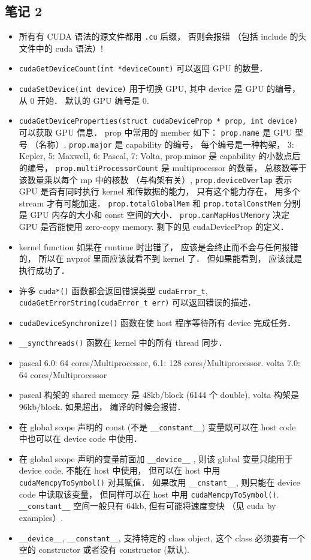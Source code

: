\subsection{笔记 2}
\begin{itemize}
\item 所有有 CUDA 语法的源文件都用 \verb`.cu` 后缀， 否则会报错 （包括 include 的头文件中的 cuda 语法）!
\item \verb`cudaGetDeviceCount(int *deviceCount)` 可以返回 GPU 的数量．
\item \verb`cudaSetDevice(int device)` 用于切换 GPU, 其中 device 是 GPU 的编号， 从 0 开始． 默认的 GPU 编号是 0.
\item \verb`cudaGetDeviceProperties(struct cudaDeviceProp * prop, int device)` 可以获取 GPU 信息． prop 中常用的 member 如下：
\verb`prop.name` 是 GPU 型号 （名称）, \verb`prop.major` 是 capability 的编号， 每个编号是一种构架， 3: Kepler,  5: Maxwell, 6: Pascal, 7: Volta, prop.minor 是 capability 的小数点后的编号， \verb`prop.multiProcessorCount` 是 multiprocessor 的数量， 总核数等于该数量乘以每个 mp 中的核数 （与构架有关）, \verb`prop.deviceOverlap` 表示 GPU 是否有同时执行 kernel 和传数据的能力， 只有这个能力存在， 用多个 stream 才有可能加速．
\verb`prop.totalGlobalMem` 和 \verb`prop.totalConstMem` 分别是 GPU 内存的大小和 const 空间的大小． \verb`prop.canMapHostMemory` 决定 GPU 是否能使用 zero-copy memory. 剩下的见 cudaDeviceProp 的定义．
\item kernel function 如果在 runtime 时出错了， 应该是会终止而不会与任何报错的， 所以在 nvprof 里面应该就看不到 kernel 了． 但如果能看到， 应该就是执行成功了．
\item 许多 \verb`cuda*()` 函数都会返回错误类型 \verb`cudaError_t`, \verb`cudaGetErrorString(cudaError_t err)` 可以返回错误的描述．
\item \verb`cudaDeviceSynchronize()` 函数在使 host 程序等待所有 device 完成任务．
\item \verb`__syncthreads()` 函数在 kernel 中的所有 thread 同步．
\item pascal 6.0: 64 cores/Multiprocessor, 6.1: 128 cores/Multiprocessor.   volta 7.0: 64 cores/Multiprocessor
\item pascal 构架的 shared memory 是 48kb/block (6144 个 double), volta 构架是 96kb/block. 如果超出， 编译的时候会报错．
\item 在 global scope 声明的 const (不是 \verb`__constant__`) 变量既可以在 host code 中也可以在 device code 中使用．
\item 在 global scope 声明的变量前面加 \verb`__device__` , 则该 global 变量只能用于 device code, 不能在 host 中使用， 但可以在 host 中用 \verb`cudaMemcpyToSymbol()` 对其赋值． 如果改用 \verb`__cnstant__`, 则只能在 device code 中读取该变量， 但同样可以在 host 中用 \verb`cudaMemcpyToSymbol()`. \verb`__constant__` 空间一般只有 64kb, 但有可能将速度变快 （见 cuda by examples）.
\item \verb`__device__`, \verb`__constant__`, 支持特定的 class object, 这个 class 必须要有一个空的 constructor 或者没有 constructor (默认).


\end{itemize}

